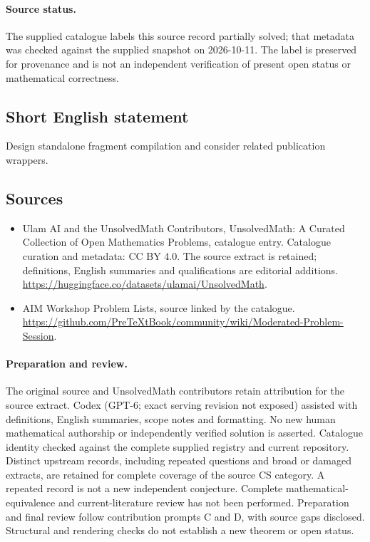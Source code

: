\documentclass[11pt]{article}
\begin{document}
\paragraph{Source status.}
The supplied catalogue labels this source record partially solved; that metadata was checked against the supplied snapshot on 2026-10-11. The label is preserved for provenance and is not an independent verification of present open status or mathematical correctness.
\subsection{Short English statement}
Design standalone fragment compilation and consider related publication wrappers.
\subsection{Sources}
\begin{itemize}
\item[\hypertarget{source:statement:1}{S1}] Ulam AI and the UnsolvedMath Contributors, UnsolvedMath: A Curated Collection of Open Mathematics Problems, catalogue entry. Catalogue curation and metadata: CC BY 4.0. The source extract is retained; definitions, English summaries and qualifications are editorial additions.
\url{https://huggingface.co/datasets/ulamai/UnsolvedMath}.
\item[\hypertarget{source:statement:2}{S2}] AIM Workshop Problem Lists, source linked by the catalogue.
\url{https://github.com/PreTeXtBook/community/wiki/Moderated-Problem-Session}.
\end{itemize}
\paragraph{Preparation and review.}
The original source and UnsolvedMath contributors retain attribution for the source extract. Codex (GPT-6; exact serving revision not exposed) assisted with definitions, English summaries, scope notes and formatting. No new human mathematical authorship or independently verified solution is asserted. Catalogue identity checked against the complete supplied registry and current repository. Distinct upstream records, including repeated questions and broad or damaged extracts, are retained for complete coverage of the source CS category. A repeated record is not a new independent conjecture. Complete mathematical-equivalence and current-literature review has not been performed. Preparation and final review follow contribution prompts C and D, with source gaps disclosed. Structural and rendering checks do not establish a new theorem or open status.
\label{end:statement}
\end{document}
